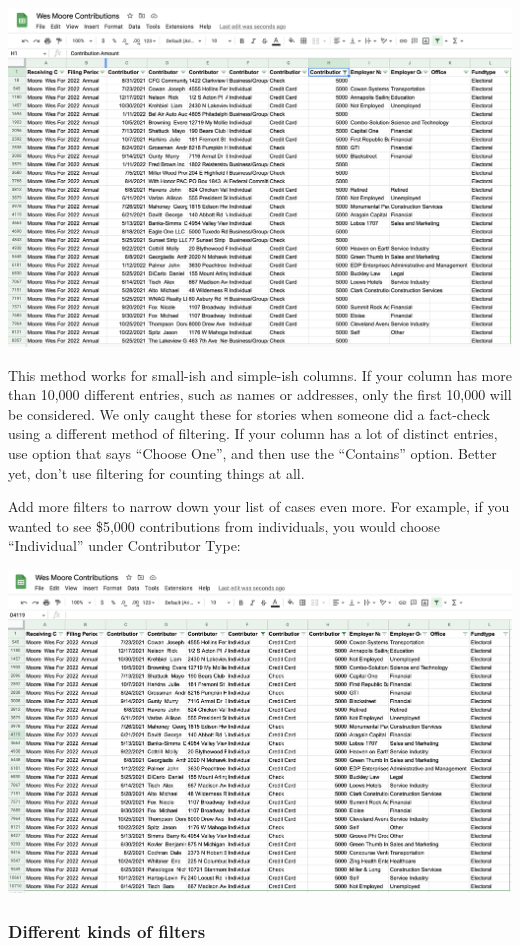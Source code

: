 \documentclass[
  letterpaper,
  DIV=11,
  numbers=noendperiod]{scrreprt}
\begin{document}
\includegraphics{./images/sheets-filter-sort-onefilter.png}

This method works for small-ish and simple-ish columns. If your column
has more than 10,000 different entries, such as names or addresses, only
the first 10,000 will be considered. We only caught these for stories
when someone did a fact-check using a different method of filtering. If
your column has a lot of distinct entries, use option that says ``Choose
One'', and then use the ``Contains'' option. Better yet, don't use
filtering for counting things at all.

Add more filters to narrow down your list of cases even more. For
example, if you wanted to see \$5,000 contributions from individuals,
you would choose ``Individual'' under Contributor Type:

\includegraphics{./images/sheets-filter-sort-twofilters.png}

\hypertarget{different-kinds-of-filters}{%
\subsubsection*{Different kinds of
filters}\label{different-kinds-of-filters}}
\end{document}

